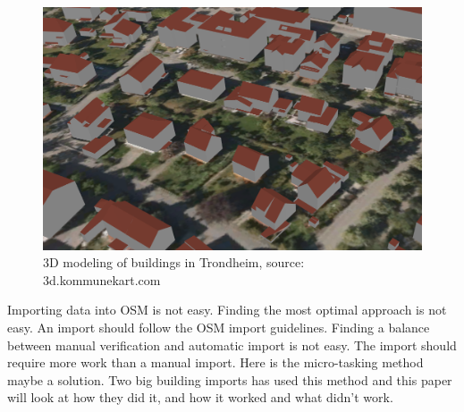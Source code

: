 \documentclass[12pt, a4paper]{report}   	%
\begin{document}
\begin{figure}[H]
    \centering
    \includegraphics[scale=0.4]{figures/FixedByMe/3DmodelTRD-FKB.png}
    \caption{3D modeling of buildings in Trondheim, source: 3d.kommunekart.com}
    \label{fig:3DekstrdFKB}
\end{figure}  

Importing data into OSM is not easy. Finding the most optimal approach is not easy. An import should follow the OSM import guidelines. Finding a balance between manual verification and automatic import is not easy. The import should require more work than a manual import. Here is the micro-tasking method maybe a solution. Two big building imports has used this method and this paper will look at how they did it, and how it worked and what didn't work. 

%
%






%


\end{document}
